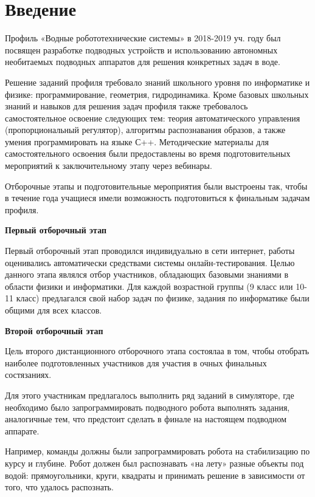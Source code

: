 %

\section*{Введение}

Профиль «Водные робототехнические системы» в 2018-2019 уч. году был посвящен разработке подводных устройств и использованию автономных необитаемых подводных аппаратов для решения конкретных задач в воде. 

Решение заданий профиля требовало знаний школьного уровня по информатике и физике: программирование, геометрия, гидродинамика. Кроме базовых школьных знаний и навыков для решения задач профиля также требовалось самостоятельное освоение следующих тем: теория автоматического управления (пропорциональный регулятор), алгоритмы распознавания образов, а также умения программировать на языке С++. Методические материалы для самостоятельного освоения были предоставлены во время подготовительных мероприятий к заключительному этапу через вебинары.

Отборочные этапы и подготовительные мероприятия были выстроены так, чтобы в течение года учащиеся имели возможность подготовиться к финальным задачам профиля.

\textbf{Первый отборочный этап}

Первый отборочный этап проводился индивидуально в сети интернет, работы оценивались автоматически средствами системы онлайн-тестирования. Целью данного этапа являлся отбор участников, обладающих базовыми знаниями в области физики и информатики.  Для каждой возрастной группы (9 класс или 10-11 класс) предлагался свой набор задач по физике, задания по информатике были общими для всех классов. 

\textbf{Второй отборочный этап}

Цель второго дистанционного отборочного этапа состоялаа в том, чтобы отобрать наиболее подготовленных участников для участия в очных финальных состязаниях. 

Для этого участникам предлагалось выполнить ряд заданий в симуляторе, где необходимо было запрограммировать подводного робота выполнять задания, аналогичные тем, что предстоит сделать в финале на настоящем подводном аппарате. 

Например, команды должны были запрограммировать робота на стабилизацию по курсу и глубине. Робот должен был распознавать «на лету» разные объекты под водой: прямоугольники, круги, квадраты и принимать решение в зависимости от того, что удалось распознать.

